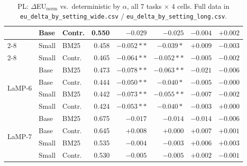 \documentclass[10pt]{article}
\begin{document}
\begin{table}[p]
\begin{tabular}{@{}lllrrrrr@{}}
 & Base & Contr. & 0.550 & $-0.029$ & $-0.025$ & $-0.004$ & $+0.002$ \\
\cmidrule(lr){2-8}
 & Small & BM25 & 0.458 & $-0.052**$ & $-0.039*$ & $+0.009$ & $-0.003$ \\
\cmidrule(lr){2-8}
 & Small & Contr. & 0.465 & $-0.064**$ & $-0.052**$ & $-0.005$ & $-0.002$ \\
\midrule
\multirow{4}{*}{LaMP-6} & Base & BM25 & 0.473 & $-0.078**$ & $-0.063**$ & $-0.021$ & $-0.006$ \\
\cmidrule(lr){2-8}
 & Base & Contr. & 0.444 & $-0.050**$ & $-0.040*$ & $-0.005$ & $-0.000$ \\
\cmidrule(lr){2-8}
 & Small & BM25 & 0.442 & $-0.073**$ & $-0.055**$ & $-0.007$ & $-0.002$ \\
\cmidrule(lr){2-8}
 & Small & Contr. & 0.424 & $-0.053**$ & $-0.040*$ & $-0.003$ & $+0.000$ \\
\midrule
\multirow{4}{*}{LaMP-7} & Base & BM25 & 0.675 & $-0.017$ & $-0.014$ & $-0.014$ & $-0.006$ \\
\cmidrule(lr){2-8}
 & Base & Contr. & 0.645 & $+0.008$ & $+0.000$ & $+0.007$ & $+0.001$ \\
\cmidrule(lr){2-8}
 & Small & BM25 & 0.535 & $-0.004$ & $-0.003$ & $+0.006$ & $+0.003$ \\
\cmidrule(lr){2-8}
 & Small & Contr. & 0.530 & $-0.005$ & $-0.005$ & $+0.002$ & $-0.001$ \\
\bottomrule
\end{tabular}
\caption{PL: $\Delta$EU$_{\text{norm}}$ vs.\ deterministic by $\alpha$, all 7 tasks
$\times$ 4 cells. Full data in \texttt{eu\_delta\_by\_setting\_wide.csv} /
\texttt{eu\_delta\_by\_setting\_long.csv}.}
\label{tab:delta-pl}
\end{table}
\end{document}
